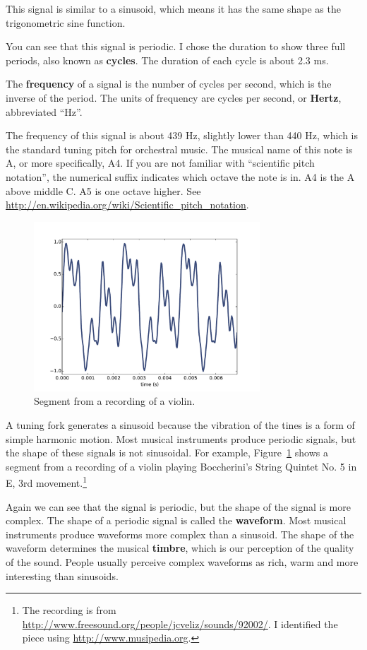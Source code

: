 \documentclass[12pt]{book}
\begin{document}
This signal is similar to a sinusoid, which means it has the same shape as
the trigonometric sine function. 

You can see that this signal is periodic.  I chose the duration
to show three full periods, also known as {\bf cycles}.
The duration of each cycle is about 2.3 ms.

The {\bf frequency} of a signal is the number of cycles
per second, which is the inverse of the period.
The units of frequency are cycles per second, or {\bf Hertz},
abbreviated ``Hz''.

The frequency of this signal is about 439 Hz, slightly lower than 440
Hz, which is the standard tuning pitch for orchestral music.  The
musical name of this note is A, or more specifically, A4.  If you are
not familiar with ``scientific pitch notation'', the numerical suffix
indicates which octave the note is in.  A4 is the A above middle C.
A5 is one octave higher.  See
\url{http://en.wikipedia.org/wiki/Scientific_pitch_notation}.

\begin{figure}
\centerline{\includegraphics[height=2.5in]{figs/violin1.pdf}}
\caption{Segment from a recording of a violin.}
\label{fig.violin1}
\end{figure}

A tuning fork generates a sinusoid because the vibration of the tines
is a form of simple harmonic motion.  Most musical instruments
produce periodic signals, but the shape of these signals is not
sinusoidal.  For example, Figure~\ref{fig.violin1} shows a segment
from a recording of a violin playing
Boccherini's String Quintet No. 5 in E, 3rd
movement.\footnote{The recording is from
  \url{http://www.freesound.org/people/jcveliz/sounds/92002/}.
I identified the piece using \url{http://www.musipedia.org}.}


Again we can see that the signal is periodic, but the shape of the
signal is more complex.  The shape of a periodic signal is called
the {\bf waveform}.  Most musical instruments produce waveforms more
complex than a sinusoid.  The shape of the waveform determines the
musical {\bf timbre}, which is our perception of the quality of the
sound.  People usually perceive complex waveforms as rich, warm and
more interesting than sinusoids.
\end{document}
